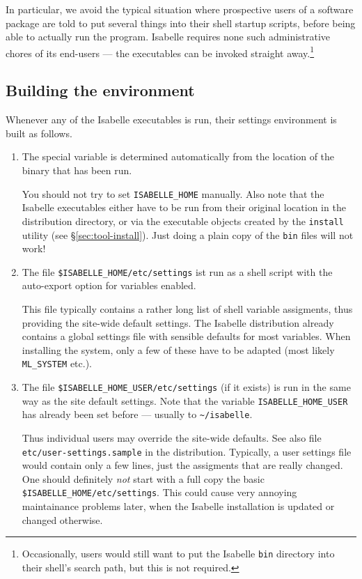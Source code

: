 In particular, we avoid the typical situation where prospective users of a
software package are told to put several things into their shell startup
scripts, before being able to actually run the program. Isabelle requires none
such administrative chores of its end-users --- the executables can be invoked
straight away.\footnote{Occasionally, users would still want to put the
  Isabelle \texttt{bin} directory into their shell's search path, but this is
  not required.}


\subsection{Building the environment}

Whenever any of the Isabelle executables is run, their settings environment is
built as follows.

\begin{enumerate}
\item The special variable  is determined automatically
  from the location of the binary that has been run.
  
  You should not try to set \texttt{ISABELLE_HOME} manually. Also note that
  the Isabelle executables either have to be run from their original location
  in the distribution directory, or via the executable objects created by the
  \texttt{install} utility (see \S\ref{sec:tool-install}).  Just doing a plain
  copy of the \texttt{bin} files will not work!
  
\item The file \texttt{\$ISABELLE_HOME/etc/settings} ist run as a shell script
  with the auto-export option for variables enabled.
  
  This file typically contains a rather long list of shell variable
  assigments, thus providing the site-wide default settings.  The Isabelle
  distribution already contains a global settings file with sensible defaults
  for most variables. When installing the system, only a few of these have to
  be adapted (most likely \texttt{ML_SYSTEM} etc.).
  
\item The file \texttt{\$ISABELLE_HOME_USER/etc/settings} (if it exists) is
  run in the same way as the site default settings. Note that the variable
  \texttt{ISABELLE_HOME_USER} has already been set before --- usually to
  \texttt{\~\relax/isabelle}.
  
  Thus individual users may override the site-wide defaults. See also file
  \texttt{etc/user-settings.sample} in the distribution.  Typically, a user
  settings file would contain only a few lines, just the assigments that are
  really changed.  One should definitely \emph{not} start with a full copy the
  basic \texttt{\$ISABELLE_HOME/etc/settings}. This could cause very annoying
  maintainance problems later, when the Isabelle installation is updated or
  changed otherwise.

\end{enumerate}

